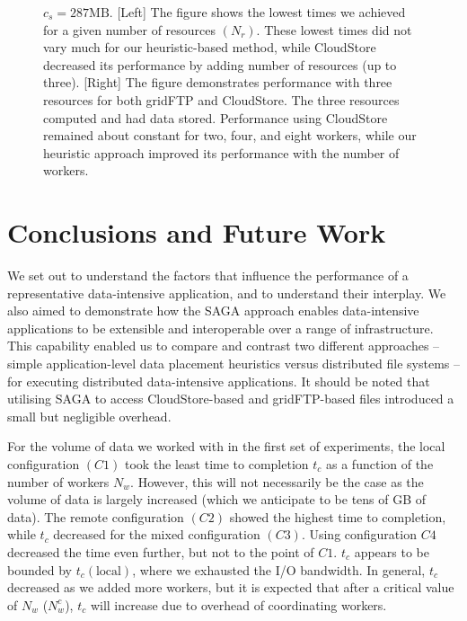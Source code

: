 \documentclass{rspublic}
\begin{document}
\begin{figure}
\begin{center}
{\label{Fig:CloudStoreVsGridFTP:b}
}
\caption{$c_s= \mbox{287MB}$. [Left] The figure
 shows the lowest times we achieved for a given number of resources
 $(N_{r})$. These lowest times did not vary much for our heuristic-based 
 method, while CloudStore decreased its performance by adding number of
 resources (up to three). [Right] The figure
 demonstrates performance with three resources for both gridFTP and
 CloudStore. The three resources computed and had data stored.
 Performance using CloudStore remained about constant for two, four, and
 eight workers, while our heuristic approach improved its performance
 with the number of workers.}
\label{Fig:CloudStoreVsGridFTP}
\end{center}
\vspace{-0.4cm}
\end{figure}

%
\vspace{-0.3cm}

\section{Conclusions and Future Work}


We set out to understand the factors that influence the performance of
a representative data-intensive application, and to understand their
interplay. We also aimed to demonstrate how the SAGA approach enables
data-intensive applications to be extensible and interoperable over a
range of infrastructure.  This capability enabled us to compare and
contrast two different approaches -- simple application-level data
placement heuristics versus distributed file systems -- for executing
distributed data-intensive applications. It should be noted that 
utilising SAGA to access CloudStore-based and gridFTP-based files
introduced a small but negligible overhead.

For the volume of data we worked with in the first set of experiments,
the local configuration $(C1)$ took the least time to completion $t_c$
as a function of the number of workers $N_w$. However, this will not
necessarily be the case as the volume of data is largely increased
(which we anticipate to be tens of GB of data).  The remote
configuration $(C2)$ showed the highest time to completion, while
$t_c$ decreased for the mixed configuration $(C3)$. Using
configuration $C4$ decreased the time even further, but not to the
point of $C1$. $t_c$ appears to be bounded by $t_c(\mbox{local})$,
where we exhausted the I/O bandwidth.  In general, $t_c$ decreased as
we added more workers, but it is expected that after a critical value
of $N_w$ ($N^c_w$), $t_c$ will increase due to overhead of
coordinating workers.
\end{document}
